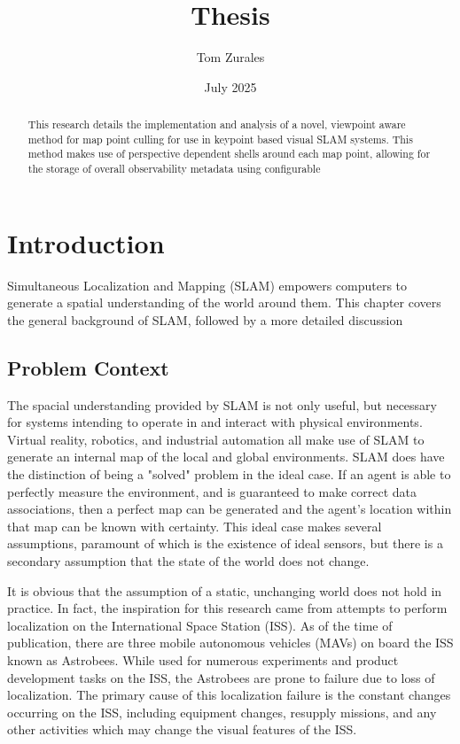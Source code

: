 \documentclass[12pt]{article}
\title{Thesis}
\author{Tom Zurales}
\date{July 2025}
\begin{document}
\doublespace

\maketitle

\begin{abstract}
  This research details the implementation and analysis of a novel, viewpoint aware method for map point culling for use in keypoint based visual SLAM systems. This method makes use of perspective dependent shells around each map point, allowing for the storage of overall observability metadata using configurable
\end{abstract}

\section{Introduction}

Simultaneous Localization and Mapping (SLAM) empowers computers to generate a spatial understanding of the world around them. This chapter covers the general background of SLAM, followed by a more detailed discussion

\subsection{Problem Context}

The spacial understanding provided by SLAM is not only useful, but necessary for systems intending to operate in and interact with physical environments. Virtual reality, robotics, and industrial automation all make use of SLAM to generate an internal map of the local and global environments. SLAM does have the distinction of being a "solved" problem in the ideal case. If an agent is able to perfectly measure the environment, and is guaranteed to make correct data associations, then a perfect map can be generated and the agent's location within that map can be known with certainty. This ideal case makes several assumptions, paramount of which is the existence of ideal sensors, but there is a secondary assumption that the state of the world does not change.

It is obvious that the assumption of a static, unchanging world does not hold in practice. In fact, the inspiration for this research came from attempts to perform localization on the International Space Station (ISS). As of the time of publication, there are three mobile autonomous vehicles (MAVs) on board the ISS known as Astrobees. While used for numerous experiments and product development tasks on the ISS, the Astrobees are prone to failure due to loss of localization. The primary cause of this localization failure is the constant changes occurring on the ISS, including equipment changes, resupply missions, and any other activities which may change the visual features of the ISS.
\end{document}
